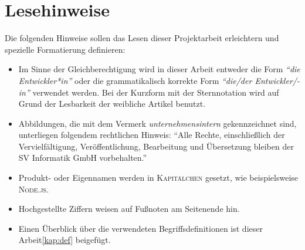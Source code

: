 \chapter*{Lesehinweise}
Die folgenden Hinweise sollen das Lesen dieser Projektarbeit erleichtern und spezielle Formatierung definieren:

\begin{itemize}
	\item Im Sinne der Gleichberechtigung wird in dieser Arbeit entweder die Form \textit{\enquote{die Entwickler*in}} oder die grammatikalisch korrekte Form \textit{\enquote{die/der Entwickler/-in}} verwendet werden. Bei der Kurzform mit der Sternnotation wird auf Grund der Lesbarkeit der weibliche Artikel benutzt.
	\item Abbildungen, die mit dem Vermerk \textit{unternehmensintern} gekennzeichnet sind, unterliegen folgendem rechtlichen Hinweis: \enquote{Alle Rechte, einschließlich der Vervielfältigung, Veröffentlichung, Bearbeitung und Übersetzung bleiben der SV Informatik GmbH vorbehalten.}
	\item Produkt- oder Eigennamen werden in \textsc{Kapitälchen} gesetzt, wie beispielsweise \textsc{Node.js}.
	\item Hochgestellte Ziffern weisen auf Fußnoten am Seitenende hin.
	\item Einen Überblick über die verwendeten Begriffsdefinitionen ist dieser Arbeit\vref{kap:def} beigefügt.
	
\end{itemize}
 
